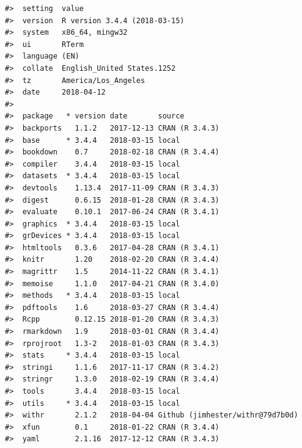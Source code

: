\documentclass[]{article}
\begin{document}
\begin{verbatim}
#>  setting  value                       
#>  version  R version 3.4.4 (2018-03-15)
#>  system   x86_64, mingw32             
#>  ui       RTerm                       
#>  language (EN)                        
#>  collate  English_United States.1252  
#>  tz       America/Los_Angeles         
#>  date     2018-04-12                  
#> 
#>  package   * version date       source                          
#>  backports   1.1.2   2017-12-13 CRAN (R 3.4.3)                  
#>  base      * 3.4.4   2018-03-15 local                           
#>  bookdown    0.7     2018-02-18 CRAN (R 3.4.4)                  
#>  compiler    3.4.4   2018-03-15 local                           
#>  datasets  * 3.4.4   2018-03-15 local                           
#>  devtools    1.13.4  2017-11-09 CRAN (R 3.4.3)                  
#>  digest      0.6.15  2018-01-28 CRAN (R 3.4.3)                  
#>  evaluate    0.10.1  2017-06-24 CRAN (R 3.4.1)                  
#>  graphics  * 3.4.4   2018-03-15 local                           
#>  grDevices * 3.4.4   2018-03-15 local                           
#>  htmltools   0.3.6   2017-04-28 CRAN (R 3.4.1)                  
#>  knitr       1.20    2018-02-20 CRAN (R 3.4.4)                  
#>  magrittr    1.5     2014-11-22 CRAN (R 3.4.1)                  
#>  memoise     1.1.0   2017-04-21 CRAN (R 3.4.0)                  
#>  methods   * 3.4.4   2018-03-15 local                           
#>  pdftools    1.6     2018-03-27 CRAN (R 3.4.4)                  
#>  Rcpp        0.12.15 2018-01-20 CRAN (R 3.4.3)                  
#>  rmarkdown   1.9     2018-03-01 CRAN (R 3.4.4)                  
#>  rprojroot   1.3-2   2018-01-03 CRAN (R 3.4.3)                  
#>  stats     * 3.4.4   2018-03-15 local                           
#>  stringi     1.1.6   2017-11-17 CRAN (R 3.4.2)                  
#>  stringr     1.3.0   2018-02-19 CRAN (R 3.4.4)                  
#>  tools       3.4.4   2018-03-15 local                           
#>  utils     * 3.4.4   2018-03-15 local                           
#>  withr       2.1.2   2018-04-04 Github (jimhester/withr@79d7b0d)
#>  xfun        0.1     2018-01-22 CRAN (R 3.4.4)                  
#>  yaml        2.1.16  2017-12-12 CRAN (R 3.4.3)
\end{verbatim}
\end{document}
